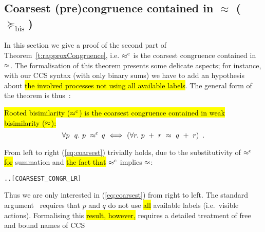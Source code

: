 
\subsection{Coarsest (pre)congruence contained in $\approx$ ($\succeq_{\mathrm{bis}}$)}
\label{s:coarsest}

In this section we give a proof of the second part of
Theorem~\ref{t:rapproxCongruence}, i.e. $\mathrel{\approx^{\rm{c}}}$ is the coarsest
congruence contained in $\approx$.
The formalisation of this theorem presents some 
delicate aspects; for instance, 
with   our CCS syntax
(with only binary sums)
we have to add  an hypothesis about 
 \hl{the involved processes  not
  using all available labels}.
The general form of the theorem is thus~\cite{van2005characterisation,Gorrieri:2015jt,Mil89}:
\begin{proposition}
\label{prop:coarsest}
  \hl{Rooted bisimilarity ($\mathrel{\approx^{\rm{c}}}$) is the coarsest congruence
    contained in weak bisimilarity ($\approx$):}
  \begin{equation}
    \label{eq:coarsest}
\forall p\ \ q.\ p\ \rapprox\ \! q\ \Longleftrightarrow\ ( \forall r.\ p\ +\
r\ \approx\ q\ +\ r )\enspace.
\end{equation}
\end{proposition}
From left to right (\ref{eq:coarsest}) trivially holds, due to the substitutivity of
$\mathrel{\approx^{\rm{c}}}$ \hl{for} summation and \hl{the fact that} $\mathrel{\approx^{\rm{c}}}$ implies $\approx$:
\begin{alltt}
\HOLTokenTurnstile{} \HOLSymConst{\HOLTokenForall{}} .  \HOLSymConst{\HOLTokenObsCongr}  \HOLSymConst{\HOLTokenImp{}} \HOLSymConst{\HOLTokenForall{}}.  \HOLSymConst{\ensuremath{+}}  \HOLSymConst{\HOLTokenWeakEQ}  \HOLSymConst{\ensuremath{+}} \hfill{[COARSEST_CONGR_LR]}
\end{alltt}
Thus we are only interested in (\ref{eq:coarsest}) from right to left.
%
The standard argument~\cite{Mil89} requires that $p$
and $q$ do not use \hl{all} available labels (i.e.~visible actions).
Formalising this \hl{result, however,} requires a detailed treatment of free and bound names of CCS
